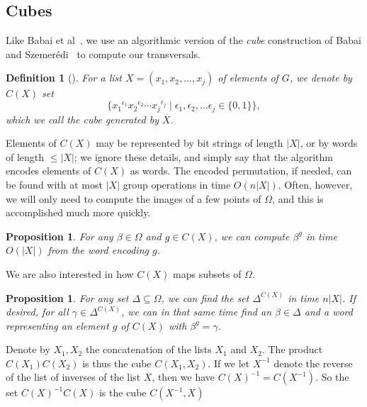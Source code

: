 \documentclass[12pt]{article}
\newtheorem{proposition}[theorem]{Proposition}
\newtheorem{definition}[theorem]{Definition}
\begin{document}
\subsection{Cubes}
Like Babai et al~\cite{babai1991nearly}, we use an algorithmic version
of the {\em cube}\/
construction of Babai and Szemer\'edi~\cite{BabaiSzemeredi1984}
to compute our transversals.
\begin{definition}[\cite{BabaiSzemeredi1984}]
  For a list $X=(x_1,x_2,\ldots,x_j)$ of elements of $G$,
  we denote by $C(X)$ set
  $$\{{x_1}^{\epsilon_1}{x_2}^{\epsilon_2}\cdots{x_j}^{\epsilon_j}\mid \epsilon_1,\epsilon_2,\ldots \epsilon_j\in\{0,1\}\},$$
  which we call the {\em cube}\/ generated by $X$.
\end{definition}
Elements of $C(X)$ may be represented by bit strings of length $|X|$,
or by words of length $\leq |X|$; we ignore these details, and simply say
that the algorithm encodes elements of $C(X)$ as words.
The encoded permutation, if needed, can be found with at most $|X|$
group operations in time $O(n|X|)$.
Often, however, we will only need to compute the
images of a few points of $\Omega$, and this is
accomplished much more quickly.
\begin{proposition}\label{image}
For any $\beta\in\Omega$
and $g\in C(X)$, we can compute $\beta^g$ in time $O(|X|)$
from the word encoding $g$.
\end{proposition}
We are also interested in how
$C(X)$ maps subsets of $\Omega$.
\begin{proposition}\label{subset}
For any set
$\Delta\subseteq\Omega$,
we can find the set $\Delta^{C(X)}$ in time $n|X|$.
If desired, for all $\gamma\in \Delta^{C(X)}$, we can in
that same time find an $\beta\in \Delta$ and
a word representing an element $g$ of $C(X)$
with $\beta^g=\gamma$.
\end{proposition}
Denote by  $X_1,X_2$ the concatenation of the
lists $X_1$ and $X_2$. The product $C(X_1)C(X_2)$
is thus the cube $C(X_1,X_2)$.  If we let $X^{-1}$ denote the reverse
of the list of inverses of the list $X$, then we have
$C(X)^{-1}=C(X^{-1})$.  So the set $C(X)^{-1}C(X)$ is the
cube $C(X^{-1},X)$
\end{document}
